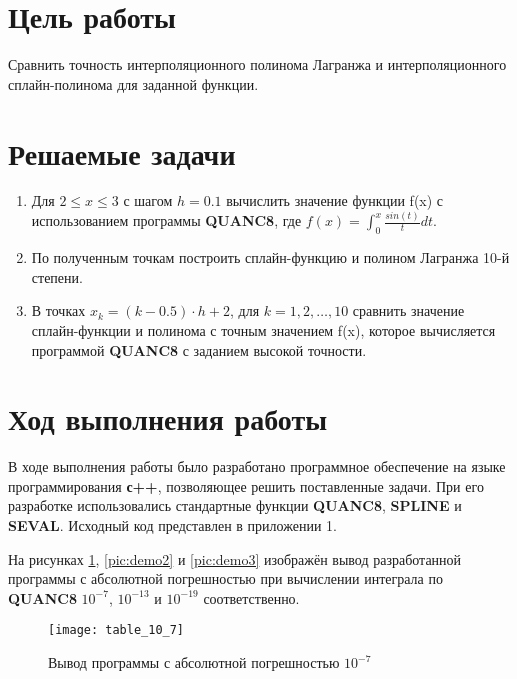 




\section{Цель работы}
Сравнить точность интерполяционного полинома Лагранжа и интерполяционного сплайн-полинома для заданной функции.

\section{Решаемые задачи}
\begin{enumerate}

\item Для $2 \leq x \leq 3$ с шагом $h = 0.1$ вычислить значение функции f(x) с использованием программы \textbf{QUANC8}, где $f(x) = \int_{0}^{x} \frac{sin(t)}{t} dt$.

\item По полученным точкам построить сплайн-функцию и полином Лагранжа 10-й степени.

\item  В точках $x_k = (k - 0.5) \cdot h + 2$, для $k = 1, 2, \dots, 10$ сравнить значение сплайн-функции и полинома с точным значением f(x), которое вычисляется программой \textbf{QUANC8} с заданием высокой точности.
\end{enumerate}


\section{Ход выполнения работы}

В ходе выполнения работы было разработано программное обеспечение на языке программирования \textbf{с++}, позволяющее решить поставленные задачи. При его разработке использовались стандартные функции \textbf{QUANC8}, \textbf{SPLINE} и \textbf{SEVAL}. Исходный код представлен в приложении 1.

 На рисунках \ref{pic:demo1}, \ref{pic:demo2}  и \ref{pic:demo3} изображён вывод разработанной программы с абсолютной погрешностью при вычислении интеграла по \textbf{QUANC8} $10^{-7}$, $10^{-13}$ и $10^{-19}$ соответственно. 
 
\begin{figure}[H]
	\begin{center}
		\texttt{[image: table\_10\_7]}
		\caption{Вывод программы с абсолютной погрешностью $10^{-7}$}
		\label{pic:demo1} %
	\end{center}
\end{figure}

